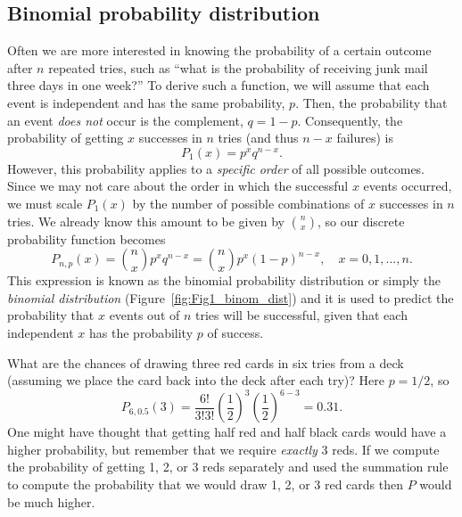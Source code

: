 \subsection{Binomial probability distribution}
\label{sec:binom}
Often we are more interested in knowing the probability of a certain outcome after $n$ repeated 
tries, such as ``what is the probability of receiving junk mail three days in one week?''  To derive such a 
function, we will assume that each event is independent and has the same probability, $p$.  Then, the 
probability that an event \emph{does not} occur is the complement, $q = 1 - p$.  Consequently, the probability of 
getting $x$ successes in $n$ tries (and thus $n - x$ failures) is
\begin{equation}
P_1(x) = p^x q^{n-x}.
\end{equation}
However, this probability applies to a \emph{specific order} of all possible outcomes.  Since we may not care about 
the order in which the successful $x$ events occurred, we must scale $P_1(x)$ by the number of 
possible combinations of $x$ successes in $n$ tries.  We already know this amount to be given by $\binom{n}{x}$,
so our discrete probability function becomes
\begin{equation}
P_{n,p}(x) = \binom{n}{x} p^x q^{n-x} = \binom{n}{x} p^x (1 - p)^{n-x}, \quad x =0, 1, \ldots, n. 
\label{eq:binomial_dist}
\end{equation}
This expression is known as the binomial probability distribution or simply the \emph{binomial distribution}
(Figure~\ref{fig:Fig1_binom_dist}) and it is used to predict the probability that $x$ events out of $n$
tries will be successful, given that each  independent $x$ has the probability $p$ of success.
\begin{example}
What are the chances of drawing three red cards in six tries from a deck (assuming we place the card back 
into the deck after each try)?  Here $p = 1/2$, so 
\begin{equation}
P_{6,0.5}(3) = \frac {6!}{3!3!} \left ( \frac{1}{2} \right ) ^3 \left ( \frac{1}{2} \right )^{6-3} = 0.31.
\end{equation}
One might have thought that getting half red and half black cards would have a higher probability, but 
remember that we require \emph{exactly} 3 reds.  If we compute the probability of getting 1, 2, or 3 reds 
separately and used the summation rule to compute the probability that we would draw 1, 2, or 3 
red cards then $P$ would be much higher.
\end{example}
